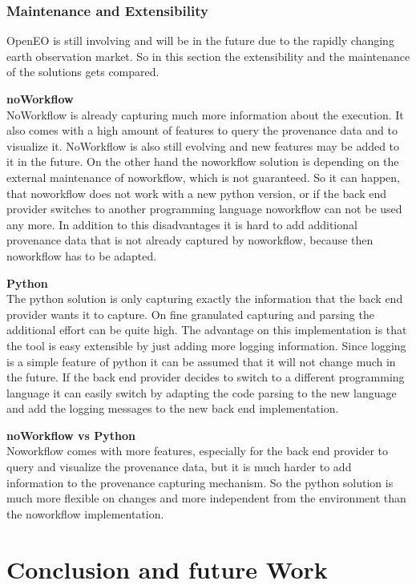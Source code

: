 \documentclass[draft,final]{vutinfth} %
\begin{document}
\subsection{Maintenance and Extensibility}\label{NvsP:Maintenance and Extensibility}
OpenEO is still involving and will be in the future due to the rapidly changing earth observation market. So in this section the extensibility and the maintenance of the solutions gets compared. 

\textbf{noWorkflow} \\
NoWorkflow is already capturing much more information about the execution. It also comes with a high amount of features to query the provenance data and to visualize it. NoWorkflow is also still evolving and new features may be added to it in the future. On the other hand the noworkflow solution is depending on the external maintenance of noworkflow, which is not guaranteed. So it can happen, that noworkflow does not work with a new python version, or if the back end provider switches to another programming language noworkflow can not be used any more. In addition to this disadvantages it is hard to add additional provenance data that is not already captured by noworkflow, because then noworkflow has to be adapted.

\textbf{Python} \\
The python solution is only capturing exactly the information that the back end provider wants it to capture. On fine granulated capturing and parsing the additional effort can be quite high. The advantage on this implementation is that the tool is easy extensible by just adding more logging information. Since logging is a simple feature of python it can be assumed that it will not change much in the future. If the back end provider decides to switch to a different programming language it can easily switch by adapting the code parsing to the new language and add the logging messages to the new back end implementation. 

\textbf{noWorkflow vs Python} \\
Noworkflow comes with more features, especially for the back end provider to query and visualize the provenance data, but it is much harder to add information to the provenance capturing mechanism. So the python solution is much more flexible on changes and more independent from the environment than the noworkflow implementation. 

\chapter{Conclusion and future Work}\label{Conclusion}
\end{document}
